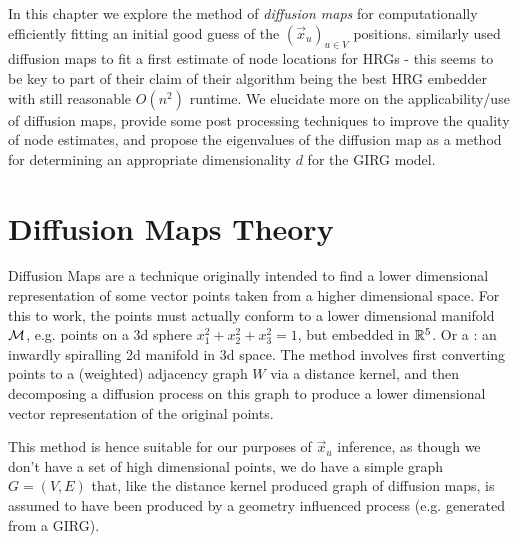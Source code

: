 In this chapter we explore the method of \textit{diffusion maps} for computationally efficiently fitting an initial good guess of the $(\vec{x}_u)_{u \in V}$ positions. \cite{garcia2019mercator} similarly used diffusion maps to fit a first estimate of node locations for HRGs - this seems to be key to part of their claim of their algorithm being the best HRG embedder with still reasonable $O(n^2)$ runtime. We elucidate more on the applicability/use of diffusion maps, provide some post processing techniques to improve the quality of node estimates, and propose the eigenvalues of the diffusion map as a method for determining an appropriate dimensionality $d$ for the GIRG model.

\section{Diffusion Maps Theory}
\label{sec:diff_maps_theory_major}
Diffusion Maps \cite{coifman2006diffusion} are a technique originally intended to find a lower dimensional representation of some vector points taken from a higher dimensional space. For this to work, the points must actually conform to a lower dimensional manifold $\mathcal{M}$, e.g. points on a 3d sphere $x_1^2 + x_2^2 + x_3^2 = 1$, but embedded in $\mathbb{R}^5$. Or a : an inwardly spiralling 2d manifold in 3d space. The method involves first converting points to a (weighted) adjacency graph $W$ via a distance kernel, and then decomposing a diffusion process on this graph to produce a lower dimensional vector representation of the original points.

This method is hence suitable for our purposes of $\vec{x}_u$ inference, as though we don't have a set of high dimensional points, we do have a simple graph $G = (V,E)$ that, like the distance kernel produced graph of diffusion maps, is assumed to have been produced by a geometry influenced process (e.g. generated from a GIRG).

